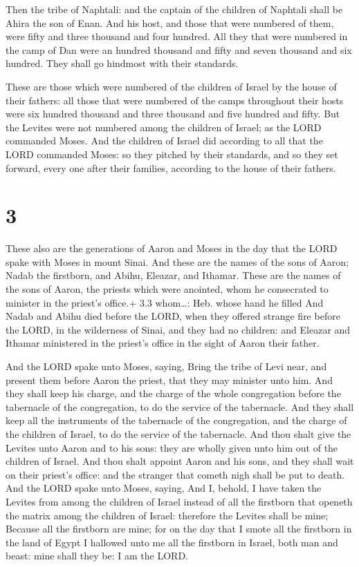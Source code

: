  Then the tribe of Naphtali: and the captain of the
children of Naphtali shall be Ahira the son of Enan.  And
his host, and those that were numbered of them, were fifty and three
thousand and four hundred.  All they that were numbered in
the camp of Dan were an hundred thousand and fifty and seven thousand
and six hundred. They shall go hindmost with their standards.

 These are those which were numbered of the children of
Israel by the house of their fathers: all those that were numbered of
the camps throughout their hosts were six hundred thousand and three
thousand and five hundred and fifty.  But the Levites were
not numbered among the children of Israel; as the LORD commanded Moses.
 And the children of Israel did according to all that the
LORD commanded Moses: so they pitched by their standards, and so they
set forward, every one after their families, according to the house of
their fathers.

\hypertarget{section-2}{%
\section{3}\label{section-2}}

 These also are the generations of Aaron and Moses in the
day that the LORD spake with Moses in mount Sinai.  And
these are the names of the sons of Aaron; Nadab the firstborn, and
Abihu, Eleazar, and Ithamar.  These are the names of the
sons of Aaron, the priests which were anointed, whom he consecrated to
minister in the priest's office.+ 3.3 whom\ldots: Heb. whose hand he
filled  And Nadab and Abihu died before the LORD, when they
offered strange fire before the LORD, in the wilderness of Sinai, and
they had no children: and Eleazar and Ithamar ministered in the priest's
office in the sight of Aaron their father.

 And the LORD spake unto Moses, saying,  Bring
the tribe of Levi near, and present them before Aaron the priest, that
they may minister unto him.  And they shall keep his charge,
and the charge of the whole congregation before the tabernacle of the
congregation, to do the service of the tabernacle.  And they
shall keep all the instruments of the tabernacle of the congregation,
and the charge of the children of Israel, to do the service of the
tabernacle.  And thou shalt give the Levites unto Aaron and
to his sons: they are wholly given unto him out of the children of
Israel.  And thou shalt appoint Aaron and his sons, and
they shall wait on their priest's office: and the stranger that cometh
nigh shall be put to death.  And the LORD spake unto Moses,
saying,  And I, behold, I have taken the Levites from among
the children of Israel instead of all the firstborn that openeth the
matrix among the children of Israel: therefore the Levites shall be
mine;  Because all the firstborn are mine; for on the day
that I smote all the firstborn in the land of Egypt I hallowed unto me
all the firstborn in Israel, both man and beast: mine shall they be: I
am the LORD.

